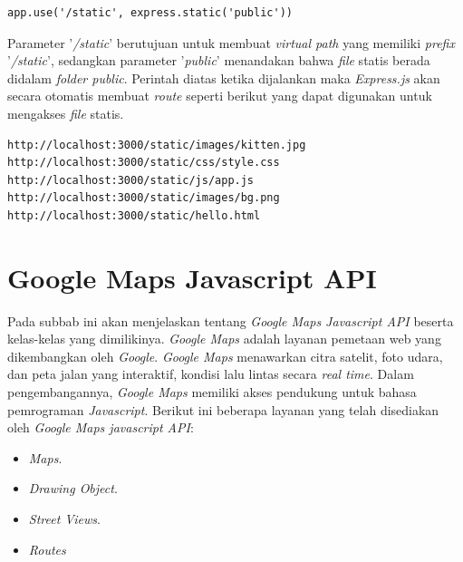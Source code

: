 \begin{lstlisting}
app.use('/static', express.static('public'))
\end{lstlisting}
Parameter '\textit{/static}' berutujuan untuk membuat \textit{virtual path} yang memiliki \textit{prefix}  '\textit{/static}', sedangkan parameter '\textit{public}' menandakan bahwa \textit{file} statis berada didalam \textit{folder public}. Perintah diatas ketika dijalankan maka \textit{Express.js} akan secara otomatis membuat \textit{route} seperti berikut yang dapat digunakan untuk mengakses \textit{file} statis.
\begin{lstlisting}
http://localhost:3000/static/images/kitten.jpg
http://localhost:3000/static/css/style.css
http://localhost:3000/static/js/app.js
http://localhost:3000/static/images/bg.png
http://localhost:3000/static/hello.html
\end{lstlisting}

	
\section{Google Maps Javascript API}
\label{sec:googlemaps}
Pada subbab ini akan menjelaskan tentang \textit{Google Maps Javascript API} beserta kelas-kelas yang dimilikinya. \textit{Google Maps} adalah layanan pemetaan web yang dikembangkan oleh \textit{Google}. \textit{Google Maps} menawarkan citra satelit, foto udara, dan peta jalan yang interaktif, kondisi lalu lintas secara \textit{real time}. Dalam pengembangannya, \textit{Google Maps} memiliki akses pendukung untuk bahasa pemrograman \textit{Javascript}. Berikut ini beberapa layanan yang telah disediakan oleh \textit{Google Maps javascript API\cite{googlemaps:01:refrence}}:

\begin{itemize}
    \item \textit{Maps}.
    \item \textit{Drawing Object}.
    \item \textit{Street Views}.
    \item \textit{Routes}
\end{itemize}

